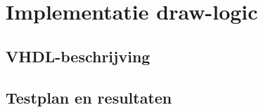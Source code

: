 \documentclass{scrreprt} %
\date{22 november 2013}
\begin{document}
\chapter{Implementatie draw-logic}
\section{VHDL-beschrijving}

\section{Testplan en resultaten}
\end{document}
